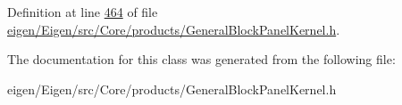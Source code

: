 Definition at line \hyperlink{eigen_2_eigen_2src_2_core_2products_2_general_block_panel_kernel_8h_source_l00464}{464} of file \hyperlink{eigen_2_eigen_2src_2_core_2products_2_general_block_panel_kernel_8h_source}{eigen/\+Eigen/src/\+Core/products/\+General\+Block\+Panel\+Kernel.\+h}.



The documentation for this class was generated from the following file\+:\begin{DoxyCompactItemize}
\item 
eigen/\+Eigen/src/\+Core/products/\+General\+Block\+Panel\+Kernel.\+h\end{DoxyCompactItemize}
